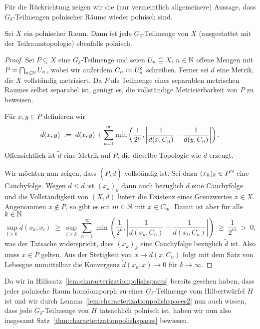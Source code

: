 \documentclass[../main/main.tex]{subfiles}
\begin{document}
	Für die Rückrichtung zeigen wir die (nur vermeintlich allgemeinere) Aussage, 
	dass $G_\delta$-Teilmengen polnischer Räume wieder polnisch sind.
	
	\begin{Hilfssatz}
		\label{lem:characterizationpolishspaces2}
		Sei $X$ ein polnischer Raum. Dann ist jede $G_\delta$-Teilmenge 
		von $X$ (ausgestattet mit der Teilraumtopologie) ebenfalls polnisch.
	\end{Hilfssatz}
	
	\begin{proof}
		Sei $P \subseteq X$ eine $G_\delta$-Teilmenge und seien 
		$U_n \subseteq X, \, n \in \mathbb{N}$ offene Mengen mit 
		$P = \bigcap_{n \in \mathbb{N}} U_n$, wobei wir außerdem 
		$C_n \vcentcolon = U_n^{\mathsf{c}}$ schreiben. Ferner sei 
		$d$ eine Metrik, die $X$ vollständig metrisiert. 
		Da $P$ als Teilmenge eines separablen metrischen Raumes 
		selbst separabel ist, genügt es, die vollständige Metrisierbarkeit 
		von $P$ zu beweisen.
		
		Für $x, y \in P$ definieren wir
		\[\tilde{d}(x, y) \; \vcentcolon = \; d(x, y) + \sum_{n=1}^{\infty} \min \left(
		\frac{1}{2^n}, \left| \frac{1}{d(x, C_n)} - \frac{1}{d(y, C_n)} \right|
		\right) \text{.}\]
		Offensichtlich ist $\tilde{d}$ eine Metrik auf $P$, 
		die dieselbe Topologie wie $d$ erzeugt. 
		
		Wir möchten nun zeigen, dass $(P, \tilde{d})$ vollständig ist. 
		Sei dazu $(x_k)_k \in P^{\mathbb{N}}$ eine Cauchyfolge. Wegen $d \leq \tilde{d}$ 
		ist $(x_k)_k$ dann auch bezüglich $d$ eine Cauchyfolge und die 
		Vollständigkeit von $(X, d)$ liefert die Existenz eines Grenzwertes 
		$x \in X$. Angenommen $x \notin P$, so gibt es ein $m \in \mathbb{N}$ mit 
		$x \in C_m$. Damit ist aber für alle $k \in \mathbb{N}$
		$$\sup_{l \geq k} \tilde{d}(x_k, x_l) \; \geq \; \sup_{l \geq k} 
		\, \sum_{n=1}^{\infty} \min \left(
		\frac{1}{2^n}, \left| \frac{1}{d(x_k, C_n)} -
		\frac{1}{d(x_l, C_n)} \right|
		\right) \; \geq \; \frac{1}{2^m} \; > \; 0 \text{,}$$
		was der Tatsache widerspricht, dass $(x_k)_k$ eine Cauchyfolge 
		bezüglich $\tilde{d}$ ist. Also muss $x \in P$ gelten. 
		Aus der Stetigkeit von $x \mapsto d(x, C_n)$ folgt mit dem 
		Satz von Lebesgue unmittelbar die Konvergenz 
		$\tilde{d}(x_k, x) \to 0$ für $k \to \infty$.
	\end{proof}
	
	Da wir in Hilfssatz~\ref{lem:characterizationpolishspaces} bereits 
	gesehen haben, dass jeder polnische Raum homöomporph zu einer 
	$G_\delta$-Teilmenge vom Hilbertwürfel $H$ ist und wir durch 
	Lemma~\ref{lem:characterizationpolishspaces2} nun auch wissen, 
	dass jede $G_\delta$-Teilmenge von $H$ tatsächlich polnisch ist, 
	haben wir nun also insgesamt Satz~\ref{thm:characterizationpolishspaces}
	bewiesen.
	
\end{document}
